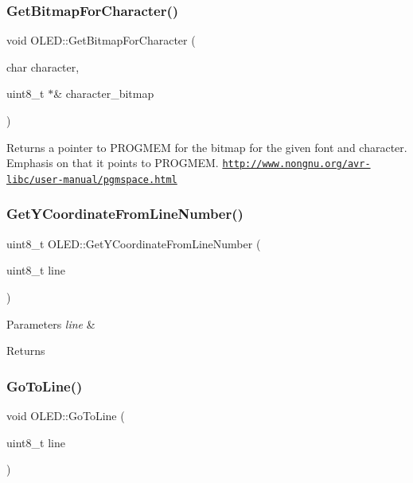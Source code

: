 \subsubsection{\texorpdfstring{Get\+Bitmap\+For\+Character()}{GetBitmapForCharacter()}}
{\footnotesize\ttfamily void O\+L\+E\+D\+::\+Get\+Bitmap\+For\+Character (\begin{DoxyParamCaption}\item[{char}]{character,  }\item[{uint8\+\_\+t $\ast$\&}]{character\+\_\+bitmap }\end{DoxyParamCaption})}

Returns a pointer to P\+R\+O\+G\+M\+EM for the bitmap for the given font and character. Emphasis on that it points to P\+R\+O\+G\+M\+EM. \href{http://www.nongnu.org/avr-libc/user-manual/pgmspace.html}{\tt http\+://www.\+nongnu.\+org/avr-\/libc/user-\/manual/pgmspace.\+html} \hypertarget{class_o_l_e_d_a5b6d41d5d699998f54ea6e3b6562ac5b}{}\label{class_o_l_e_d_a5b6d41d5d699998f54ea6e3b6562ac5b} 
\subsubsection{\texorpdfstring{Get\+Y\+Coordinate\+From\+Line\+Number()}{GetYCoordinateFromLineNumber()}}
{\footnotesize\ttfamily uint8\+\_\+t O\+L\+E\+D\+::\+Get\+Y\+Coordinate\+From\+Line\+Number (\begin{DoxyParamCaption}\item[{uint8\+\_\+t}]{line }\end{DoxyParamCaption})}


\begin{DoxyParams}{Parameters}
{\em line} & \\
\hline
\end{DoxyParams}
\begin{DoxyReturn}{Returns}

\end{DoxyReturn}
\hypertarget{class_o_l_e_d_a8d314130676b104ed959b92ab4bac25e}{}\label{class_o_l_e_d_a8d314130676b104ed959b92ab4bac25e} 
\subsubsection{\texorpdfstring{Go\+To\+Line()}{GoToLine()}}
{\footnotesize\ttfamily void O\+L\+E\+D\+::\+Go\+To\+Line (\begin{DoxyParamCaption}\item[{uint8\+\_\+t}]{line }\end{DoxyParamCaption})}

